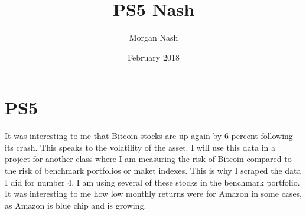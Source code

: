 \documentclass{article}
\title{PS5 Nash}
\author{Morgan Nash}
\date{February 2018}
\begin{document}
\maketitle

\section{PS5}
It was interesting to me that Bitcoin stocks are up again by 6 percent following its crash. This speaks to the volatility of the asset. I will use this data in a project for another class where I am measuring the risk of Bitcoin compared to the risk of benchmark portfolios or maket indexes. This is why I scraped the data I did for number 4. I am using several of these stocks in the benchmark portfolio. It was interesting to me how low monthly returns were for Amazon in some cases, as Amazon is blue chip and is growing.
\end{document}
